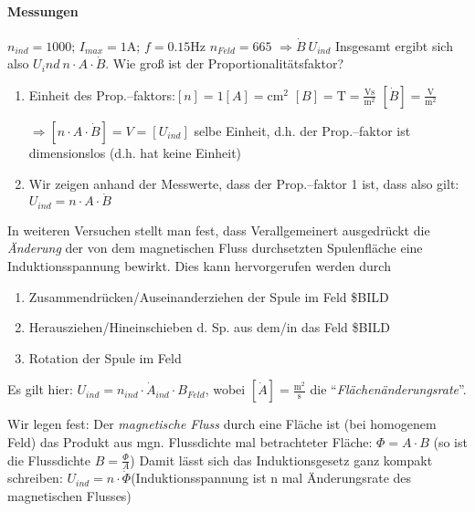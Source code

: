 \documentclass[a4paper]{scrartcl}
\begin{document}
\paragraph{Messungen}
\(n_{ind} = 1000\); %
\(I_{max} = 1\mathrm{A}\); %
\(f=0.15\mathrm{Hz}\)%
\(n_{Feld} = 665\)%
\(\Rightarrow \dot{B}~U_{ind}\)%
Insgesamt ergibt sich also \(U_ind ~ n \cdot A \cdot \dot{B}\). Wie groß ist der
Proportionalitätsfaktor?
\begin{enumerate}
	\item Einheit des Prop.--faktors:\([n]=1\)\([A]=\mathrm{cm^2}\)
	\([B]=\mathrm{T}=
		\frac{\mathrm{Vs}}{\mathrm{m^2}}\)
		\([\dot{B}]=\frac{\mathrm{V}}{\mathrm{m^2}}\)
		
		\(\Rightarrow [n \cdot A \cdot \dot{B}]=V=[U_{ind}]\)
		selbe Einheit, d.h. der Prop.--faktor ist dimensionslos (d.h. hat keine
		Einheit)
	\item Wir zeigen anhand der Messwerte, dass der Prop.--faktor 1 ist,
		dass also gilt: \(U_{ind} = n \cdot A \cdot \dot{B}\)
\end{enumerate}

In weiteren Versuchen stellt man fest, dass Verallgemeinert ausgedrückt die
\emph{Änderung} der von dem magnetischen Fluss durchsetzten Spulenfläche
eine Induktionsspannung bewirkt. Dies kann hervorgerufen werden durch
\begin{enumerate}
	\item Zusammendrücken/Auseinanderziehen der Spule im Feld \$BILD %
	\item Herausziehen/Hineinschieben d. Sp. aus dem/in das Feld \$BILD %
	\item Rotation der Spule im Feld
\end{enumerate}
Es gilt hier: \(U_{ind} = n_{ind} \cdot \dot{A}_{ind} \cdot B_{Feld}\), wobei
\([\dot{A}]=\frac{\mathrm{m^2}}{\mathrm{s}}\) die
"`\emph{Flächenänderungsrate}"'. %

Wir legen fest: Der \emph{magnetische Fluss} durch eine Fläche ist (bei
homogenem Feld) das Produkt aus mgn. Flussdichte mal betrachteter Fläche:
\(\Phi = A \cdot B\) (so ist die Flussdichte \(B=\frac{\Phi}{A}\)) %
Damit lässt sich das Induktionsgesetz ganz kompakt schreiben:
\(U_{ind} = n \cdot \dot{\Phi}\)(Induktionsspannung ist n mal Änderungsrate
des magnetischen Flusses)
\end{document}
